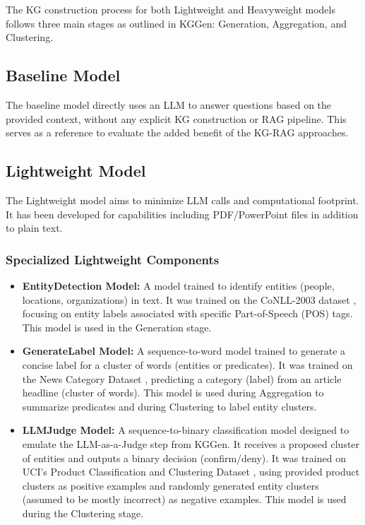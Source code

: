 \documentclass{article}
\begin{document}
The KG construction process for both Lightweight and Heavyweight models follows three main stages as outlined in KGGen: Generation, Aggregation, and Clustering.

\subsection{Baseline Model}
The baseline model directly uses an LLM to answer questions based on the provided context, without any explicit KG construction or RAG pipeline. This serves as a reference to evaluate the added benefit of the KG-RAG approaches.

\subsection{Lightweight Model}
The Lightweight model aims to minimize LLM calls and computational footprint. It has been developed for capabilities including PDF/PowerPoint files in addition to plain text.

\subsubsection{Specialized Lightweight Components}
\begin{itemize}[noitemsep,topsep=0pt]
    \item \textbf{EntityDetection Model:} A model trained to identify entities (people, locations, organizations) in text. It was trained on the CoNLL-2003 dataset \citep{tjongkimsang2003introduction}, focusing on entity labels associated with specific Part-of-Speech (POS) tags. This model is used in the Generation stage.
    \item \textbf{GenerateLabel Model:} A sequence-to-word model trained to generate a concise label for a cluster of words (entities or predicates). It was trained on the News Category Dataset \citep{misra2018news}, predicting a category (label) from an article headline (cluster of words). This model is used during Aggregation to summarize predicates and during Clustering to label entity clusters.
    \item \textbf{LLMJudge Model:} A sequence-to-binary classification model designed to emulate the LLM-as-a-Judge step from KGGen. It receives a proposed cluster of entities and outputs a binary decision (confirm/deny). It was trained on UCI's Product Classification and Clustering Dataset \citep{uciproductdataset}, using provided product clusters as positive examples and randomly generated entity clusters (assumed to be mostly incorrect) as negative examples. This model is used during the Clustering stage.
\end{itemize}
\end{document}
